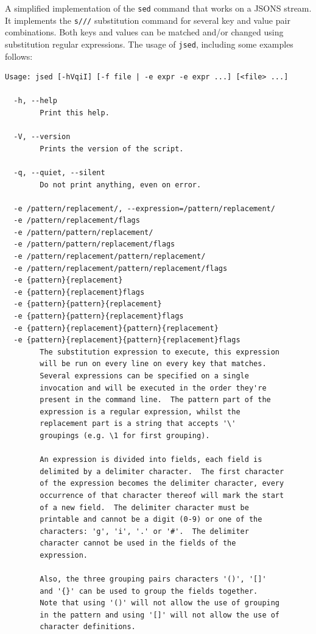 \documentclass[11pt,a4paper,twoside,openright]{report}
\begin{document}
A simplified implementation of the \texttt{sed} command that works on a JSONS
stream.  It implements the \texttt{s///} substitution command for several key
and value pair combinations.  Both keys and values can be matched and/or
changed using substitution regular expressions.  The usage of \texttt{jsed},
including some examples follows:

{\small
\begin{verbatim}
Usage: jsed [-hVqiI] [-f file | -e expr -e expr ...] [<file> ...]

  -h, --help
        Print this help.

  -V, --version
        Prints the version of the script.

  -q, --quiet, --silent
        Do not print anything, even on error.

  -e /pattern/replacement/, --expression=/pattern/replacement/
  -e /pattern/replacement/flags
  -e /pattern/pattern/replacement/
  -e /pattern/pattern/replacement/flags
  -e /pattern/replacement/pattern/replacement/
  -e /pattern/replacement/pattern/replacement/flags
  -e {pattern}{replacement}
  -e {pattern}{replacement}flags
  -e {pattern}{pattern}{replacement}
  -e {pattern}{pattern}{replacement}flags
  -e {pattern}{replacement}{pattern}{replacement}
  -e {pattern}{replacement}{pattern}{replacement}flags
        The substitution expression to execute, this expression
        will be run on every line on every key that matches.
        Several expressions can be specified on a single
        invocation and will be executed in the order they're
        present in the command line.  The pattern part of the
        expression is a regular expression, whilst the
        replacement part is a string that accepts '\'
        groupings (e.g. \1 for first grouping).

        An expression is divided into fields, each field is
        delimited by a delimiter character.  The first character
        of the expression becomes the delimiter character, every
        occurrence of that character thereof will mark the start
        of a new field.  The delimiter character must be
        printable and cannot be a digit (0-9) or one of the
        characters: 'g', 'i', '.' or '#'.  The delimiter
        character cannot be used in the fields of the
        expression.

        Also, the three grouping pairs characters '()', '[]'
        and '{}' can be used to group the fields together.
        Note that using '()' will not allow the use of grouping
        in the pattern and using '[]' will not allow the use of
        character definitions.


\end{verbatim}}
\end{document}
